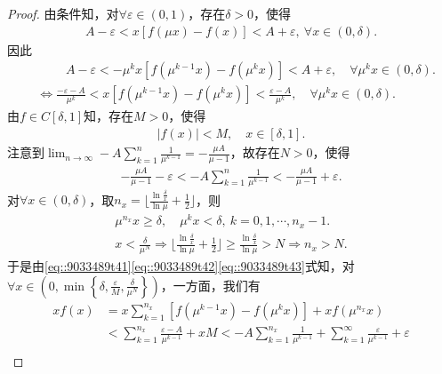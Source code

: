 \documentclass[../../main.tex]{subfiles}%
\begin{document}
\begin{proof}

由条件知，对$\forall \varepsilon \in (0,1)$，存在$\delta > 0$，使得
\begin{align*}
A - \varepsilon < x\left[ f\left( \mu x \right) - f\left( x \right) \right] < A + \varepsilon, \ \forall x \in (0,\delta). 
\end{align*}
因此
\begin{align}
&\quad \quad \,\,A-\varepsilon <-\mu ^kx\left[ f\left( \mu ^{k-1}x \right) -f\left( \mu ^kx \right) \right] <A+\varepsilon , \quad \forall \mu ^kx\in (0,\delta ).
\nonumber \\
&\Longleftrightarrow \frac{-\varepsilon -A}{\mu ^k}<x\left[ f\left( \mu ^{k-1}x \right) -f\left( \mu ^kx \right) \right] <\frac{\varepsilon -A}{\mu ^k}, \quad  \forall \mu ^kx\in (0,\delta ).\label{eq::9033489t41}
\end{align}
由$f \in C\left[ \delta,1 \right]$知，存在$M > 0$，使得
\begin{align}
\left| f\left( x \right) \right| < M, \quad x \in \left[ \delta,1 \right]. \label{eq::9033489t42}
\end{align}
注意到$\lim_{n \to \infty} -A\sum_{k=1}^n \frac{1}{\mu^{k-1}} = -\frac{\mu A}{\mu - 1}$，故存在$N > 0$，使得
\begin{align}
-\frac{\mu A}{\mu - 1} - \varepsilon < -A\sum_{k=1}^n \frac{1}{\mu^{k-1}} < -\frac{\mu A}{\mu - 1} + \varepsilon. \label{eq::9033489t43}
\end{align}
对$\forall x \in (0,\delta)$，取$n_x = \lfloor \frac{\ln \frac{\delta}{x}}{\ln \mu} + \frac{1}{2} \rfloor$，则
\begin{gather*}
\mu^{n_x} x \geqslant \delta, \quad \mu^k x < \delta, \ k = 0,1,\cdots,n_x - 1.\\
x < \frac{\delta}{\mu^N} \Longrightarrow \lfloor \frac{\ln \frac{\delta}{x}}{\ln \mu} + \frac{1}{2} \rfloor \geqslant \frac{\ln \frac{\delta}{x}}{\ln \mu} > N \Longrightarrow n_x > N.
\end{gather*}
于是由\eqref{eq::9033489t41}\eqref{eq::9033489t42}\eqref{eq::9033489t43}式知，对$\forall x \in \left( 0,\min \left\{ \delta, \frac{\varepsilon}{M}, \frac{\delta}{\mu^N} \right\} \right)$，一方面，我们有
\begin{align*}
xf\left( x \right) &= x\sum_{k=1}^{n_x} \left[ f\left( \mu^{k-1}x \right) - f\left( \mu^k x \right) \right] + xf\left( \mu^{n_x} x \right) \\
&< \sum_{k=1}^{n_x} \frac{\varepsilon - A}{\mu^{k-1}} + xM < -A\sum_{k=1}^{n_x} \frac{1}{\mu^{k-1}} + \sum_{k=1}^{\infty} \frac{\varepsilon}{\mu^{k-1}} + \varepsilon \\

\end{align*}
\end{proof}
\end{document}
